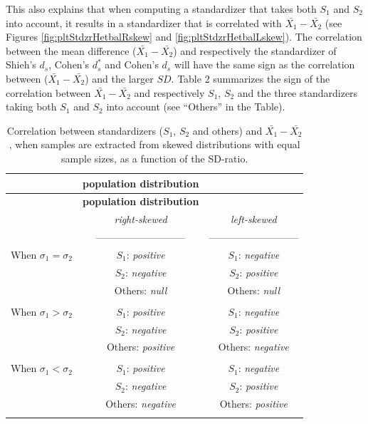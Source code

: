 \documentclass[
  english,
  man,mask]{apa6}
\begin{document}
This also explains that when computing a standardizer that takes both \(S_1\) and \(S_2\) into account, it results in a standardizer that is correlated with \(\bar{X_1}-\bar{X_2}\) (see Figures \ref{fig:pltStdzrHetbalRskew} and \ref{fig:pltStdzrHetbalLskew}). The correlation between the mean difference (\(\bar{X_1}-\bar{X_2}\)) and respectively the standardizer of Shieh's \(d_s\), Cohen's \(d^*_s\) and Cohen's \(d_s\) will have the same sign as the correlation between (\(\bar{X_1}-\bar{X_2}\)) and the larger \(SD\). Table 2 summarizes the sign of the correlation between \(\bar{X_1}-\bar{X_2}\) and respectively \(S_1\), \(S_2\) and the three standardizers taking both \(S_1\) and \(S_2\) into account (see ``Others'' in the Table).

\begin{longtable}[]{@{}lcc@{}}
\caption{Correlation between standardizers (\(S_1\), \(S_2\) and others) and \(\bar{X_1}-\bar{X_2}\), when samples are extracted from skewed distributions with equal sample sizes, as a function of the SD-ratio.}\tabularnewline
\toprule
& \textbf{\textbf{population distribution}} & \\
\midrule
\endfirsthead
\toprule
& \textbf{\textbf{population distribution}} & \\
\midrule
\endhead
& \emph{right-skewed} & \emph{left-skewed} \\
& --------------------------- & --------------------------- \\
When \(\sigma_1=\sigma_2\) & \(S_1\): \emph{positive} & \(S_1\): \emph{negative} \\
& \(S_2\): \emph{negative} & \(S_2\): \emph{positive} \\
& Others: \emph{null} & Others: \emph{null} \\
& & \\
When \(\sigma_1>\sigma_2\) & \(S_1\): \emph{positive} & \(S_1\): \emph{negative} \\
& \(S_2\): \emph{negative} & \(S_2\): \emph{positive} \\
& Others: \emph{positive} & Others: \emph{negative} \\
& & \\
When \(\sigma_1<\sigma_2\) & \(S_1\): \emph{positive} & \(S_1\): \emph{negative} \\
& \(S_2\): \emph{negative} & \(S_2\): \emph{positive} \\
& Others: \emph{negative} & Others: \emph{positive} \\
& & \\
\bottomrule
\end{longtable}
\end{document}
